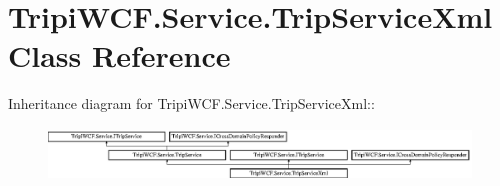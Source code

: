 \hypertarget{class_tripi_w_c_f_1_1_service_1_1_trip_service_xml}{
\section{TripiWCF.Service.TripServiceXml Class Reference}
\label{class_tripi_w_c_f_1_1_service_1_1_trip_service_xml}
}
Inheritance diagram for TripiWCF.Service.TripServiceXml::\begin{figure}[H]
\begin{center}
\leavevmode
\includegraphics[height=1.40468cm]{class_tripi_w_c_f_1_1_service_1_1_trip_service_xml}
\end{center}
\end{figure}
